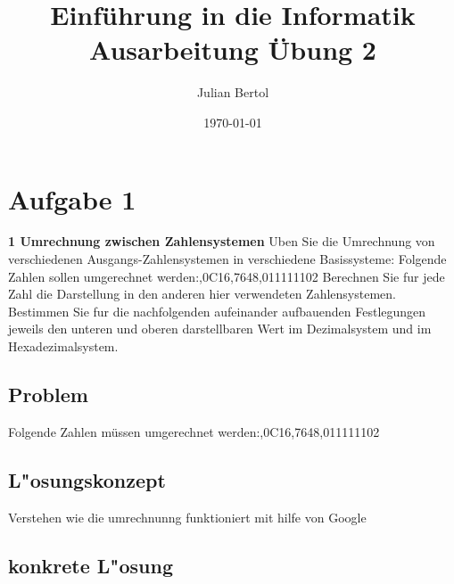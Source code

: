 \documentclass[a4paper,11pt,titlepage]{article}
\begin{document}
\title{Einf\"uhrung in die Informatik\\
Ausarbeitung \"Ubung 2}


\author{Julian Bertol}


\date{\today}

\maketitle{\thispagestyle{plain}}

\section{Aufgabe 1}
\textbf{1 Umrechnung zwischen Zahlensystemen} \newline
Uben Sie die Umrechnung von verschiedenen Ausgangs-Zahlensystemen in verschiedene Basissysteme:\newline
Folgende Zahlen sollen umgerechnet werden:,0C16,7648,011111102\newline
Berechnen Sie fur jede Zahl die Darstellung in den anderen hier verwendeten Zahlensystemen.\newline
Bestimmen Sie fur die nachfolgenden aufeinander aufbauenden Festlegungen jeweils den unteren und oberen darstellbaren Wert im Dezimalsystem und im Hexadezimalsystem.

\subsection{Problem}
Folgende Zahlen müssen umgerechnet werden:,0C16,7648,011111102 \newline
\subsection{L"osungskonzept}
Verstehen wie die umrechnunng funktioniert mit hilfe von Google \newline
\pagebreak

\subsection{konkrete L"osung}
\end{document}

